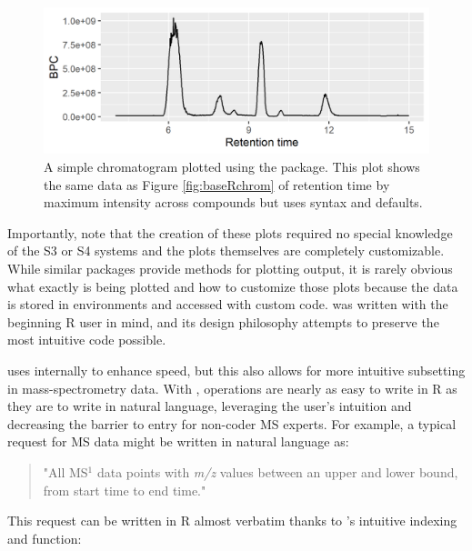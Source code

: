 
\begin{figure}[h!]
    \includegraphics[]{ggplotchrom.png}
    \caption{A simple chromatogram plotted using the  package. This plot shows the same data as Figure \ref{fig:baseRchrom} of retention time by maximum intensity across compounds but uses  syntax and defaults.}
    \label{fig:ggplotchrom}
\end{figure}

Importantly, note that the creation of these plots required no special knowledge of the S3 or S4 systems and the plots themselves are completely customizable. While similar packages provide methods for plotting output, it is rarely obvious what exactly is being plotted and how to customize those plots because the data is stored in environments and accessed with custom code.  was written with the beginning R user in mind, and its design philosophy attempts to preserve the most intuitive code possible.

 uses  internally to enhance speed, but this also allows for more intuitive subsetting in mass-spectrometry data. With , operations are nearly as easy to write in R as they are to write in natural language, leveraging the user's intuition and decreasing the barrier to entry for non-coder MS experts. For example, a typical request for MS data might be written in natural language as:

\begin{quote}
    "All MS$^1$ data points with \emph{m/z} values between an upper and lower bound, from start time to end time."
\end{quote}

This request can be written in R almost verbatim thanks to 's intuitive indexing and  function:

